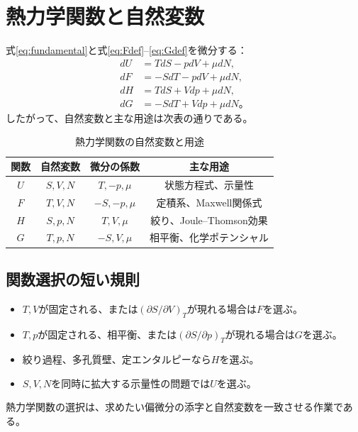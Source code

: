 \documentclass[platex,dvipdfmx,a4paper,10pt]{jsarticle}
\newcommand{\key}[1]{\begin{framed}\noindent #1\end{framed}}
\begin{document}
\section{熱力学関数と自然変数}\label{sec:potentials}
式\eqref{eq:fundamental}と式\eqref{eq:Fdef}--\eqref{eq:Gdef}を微分する：
\begin{align}
  dU&=TdS-pdV+\mu dN,\label{eq:dU}\\
  dF&=-SdT-pdV+\mu dN,\label{eq:dF}\\
  dH&=TdS+Vdp+\mu dN,\label{eq:dH}\\
  dG&=-SdT+Vdp+\mu dN。\label{eq:dG}
\end{align}
したがって、自然変数と主な用途は次表の通りである。
\begin{table}[H]
\centering
\caption{熱力学関数の自然変数と用途}
\begin{tabular}{cccc}
\toprule
関数 & 自然変数 & 微分の係数 & 主な用途\\
\midrule
$U$ & $S,V,N$ & $T,-p,\mu$ & 状態方程式、示量性\\
$F$ & $T,V,N$ & $-S,-p,\mu$ & 定積系、Maxwell関係式\\
$H$ & $S,p,N$ & $T,V,\mu$ & 絞り、Joule--Thomson効果\\
$G$ & $T,p,N$ & $-S,V,\mu$ & 相平衡、化学ポテンシャル\\
\bottomrule
\end{tabular}
\end{table}

\subsection{関数選択の短い規則}
\begin{itemize}
  \item $T,V$が固定される、または$(\partial S/\partial V)_T$が現れる場合は$F$を選ぶ。
  \item $T,p$が固定される、相平衡、または$(\partial S/\partial p)_T$が現れる場合は$G$を選ぶ。
  \item 絞り過程、多孔質壁、定エンタルピーなら$H$を選ぶ。
  \item $S,V,N$を同時に拡大する示量性の問題では$U$を選ぶ。
\end{itemize}

\key{熱力学関数の選択は、求めたい偏微分の添字と自然変数を一致させる作業である。}

\newpage
\end{document}
